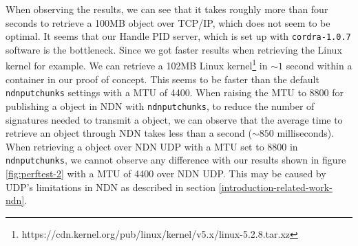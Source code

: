 When observing the results, we can see that it takes roughly more than four seconds to retrieve a 100MB object over TCP/IP, which does not seem to be optimal. 
It seems that our Handle PID server, which is set up with \texttt{cordra-1.0.7} software is the bottleneck. Since we got faster results when retrieving the Linux kernel for example. We can retrieve a 102MB Linux kernel\footnote{https://cdn.kernel.org/pub/linux/kernel/v5.x/linux-5.2.8.tar.xz} in ${\sim}1$ second within a container in our proof of concept. This seems to be faster than the default \texttt{ndnputchunks} settings with a MTU of 4400. When raising the MTU to 8800 for publishing a object in NDN with \texttt{ndnputchunks}, to reduce the number of signatures needed to transmit a object, we can observe that the average time to retrieve an object through NDN takes less than a second (${\sim}850$ milliseconds). 
When retrieving a object over NDN UDP with a MTU set to 8800 in \texttt{ndnputchunks}, we cannot observe any difference with our results shown in figure \ref{fig:perftest-2} with a MTU of 4400 over NDN UDP. This may be caused by UDP's limitations in NDN as described in section \ref{introduction-related-work-ndn}. 



